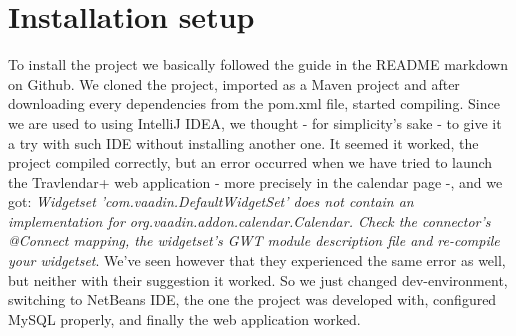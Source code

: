 \chapter{Installation setup}
\label{cha:installation}

To install the project we basically followed the guide in the README markdown on Github. We cloned the project, imported as a Maven project and after downloading every dependencies from the pom.xml file, started compiling. Since we are used to using IntelliJ IDEA, we thought - for simplicity's sake - to give it a try with such IDE without installing another one. It seemed it worked, the project compiled correctly, but an error occurred when we have tried to launch the Travlendar+ web application - more precisely in the calendar page -, and we got: \textit{Widgetset 'com.vaadin.DefaultWidgetSet' does not contain an implementation for org.vaadin.addon.calendar.Calendar. Check the connector's @Connect mapping, the widgetset's GWT module description file and re-compile your widgetset}. We've seen however that they experienced the same error as well, but neither with their suggestion it worked.
So we just changed dev-environment, switching to NetBeans IDE, the one the project was developed with, configured MySQL properly, and finally the web application worked.





